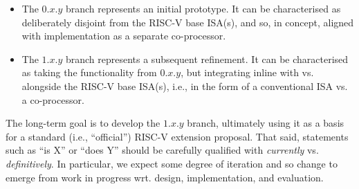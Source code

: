 \begin{itemize}
\item The $0.x.y$ branch
      represents an initial prototype.
      It can be characterised as deliberately disjoint from the RISC-V 
      base ISA(s), and so, in concept, aligned with implementation as a 
      separate co-processor.
\item The $1.x.y$ branch
      represents a subsequent refinement.
      It can be characterised as taking the functionality from $0.x.y$, 
      but integrating inline with vs. alongside the RISC-V base ISA(s), 
      i.e., in the form of a conventional ISA vs. a co-processor.
\end{itemize}

\noindent
The long-term goal is to develop the $1.x.y$ branch, ultimately using it
as a basis for a standard (i.e., ``official'') RISC-V extension proposal.
That said, statements such as 
``\XCID is   X'' 
or
``\XCID does Y''
should be carefully qualified with {\em currently} vs. {\em definitively}.  
In particular, we expect some degree of iteration and so change to emerge 
from work in progress wrt. design, implementation, and evaluation.

